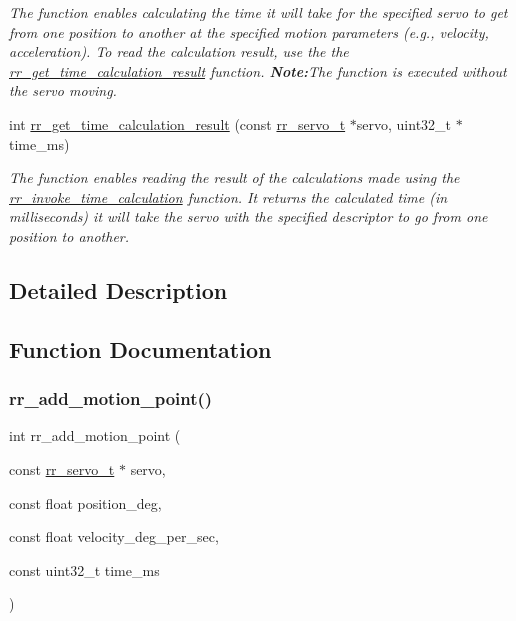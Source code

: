 \begin{DoxyCompactItemize}
\begin{DoxyCompactList}\small\item\em The function enables calculating the time it will take for the specified servo to get from one position to another at the specified motion parameters (e.\+g., velocity, acceleration). To read the calculation result, use the the \hyperlink{group___trajectory_ga0d01b53187b97dacd7611dacb37024d8}{rr\+\_\+get\+\_\+time\+\_\+calculation\+\_\+result} function. {\bfseries Note\+:}The function is executed without the servo moving.~\newline
 \end{DoxyCompactList}\item 
int \hyperlink{group___trajectory_ga0d01b53187b97dacd7611dacb37024d8}{rr\+\_\+get\+\_\+time\+\_\+calculation\+\_\+result} (const \hyperlink{structrr__servo__t}{rr\+\_\+servo\+\_\+t} $\ast$servo, uint32\+\_\+t $\ast$time\+\_\+ms)
\begin{DoxyCompactList}\small\item\em The function enables reading the result of the calculations made using the \hyperlink{group___trajectory_gabaa2275097c9ec4bb2807b65d83e3303}{rr\+\_\+invoke\+\_\+time\+\_\+calculation} function. It returns the calculated time (in milliseconds) it will take the servo with the specified descriptor to go from one position to another. \end{DoxyCompactList}\end{DoxyCompactItemize}


\subsection{Detailed Description}


\subsection{Function Documentation}
\mbox{\label{group___trajectory_gaba5ac04eeadd4a8d888b409f34837ece}} 
\subsubsection{\texorpdfstring{rr\+\_\+add\+\_\+motion\+\_\+point()}{rr\_add\_motion\_point()}}
{\footnotesize\ttfamily int rr\+\_\+add\+\_\+motion\+\_\+point (\begin{DoxyParamCaption}\item[{const \hyperlink{structrr__servo__t}{rr\+\_\+servo\+\_\+t} $\ast$}]{servo,  }\item[{const float}]{position\+\_\+deg,  }\item[{const float}]{velocity\+\_\+deg\+\_\+per\+\_\+sec,  }\item[{const uint32\+\_\+t}]{time\+\_\+ms }\end{DoxyParamCaption})}



